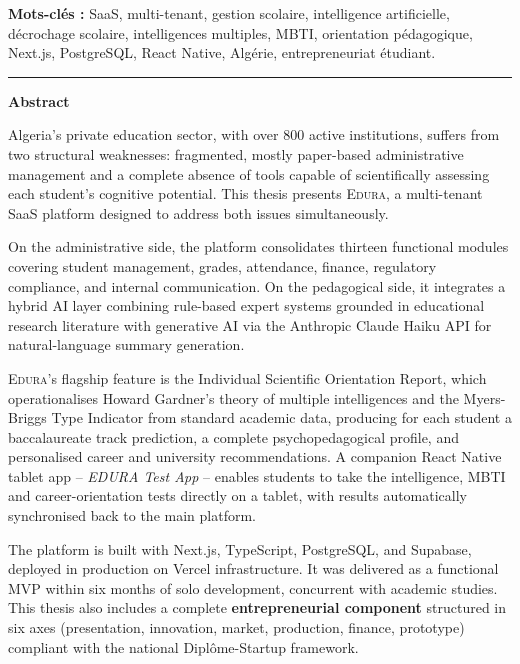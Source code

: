 \documentclass[12pt,a4paper,oneside]{report}
\newcommand{\edura}{\textsc{Edura}}
\begin{document}
\vspace{10pt}
\noindent\textbf{Mots-clés :} SaaS, multi-tenant, gestion scolaire, intelligence artificielle, décrochage scolaire, intelligences multiples, MBTI, orientation pédagogique, Next.js, PostgreSQL, React Native, Algérie, entrepreneuriat étudiant.

\vspace{20pt}
\noindent\rule{\linewidth}{0.4pt}

\vspace{10pt}
\noindent\textbf{Abstract}

\vspace{6pt}
Algeria's private education sector, with over 800 active institutions, suffers from two structural weaknesses: fragmented, mostly paper-based administrative management and a complete absence of tools capable of scientifically assessing each student's cognitive potential. This thesis presents \edura{}, a multi-tenant SaaS platform designed to address both issues simultaneously.

On the administrative side, the platform consolidates thirteen functional modules covering student management, grades, attendance, finance, regulatory compliance, and internal communication. On the pedagogical side, it integrates a hybrid AI layer combining rule-based expert systems grounded in educational research literature with generative AI via the Anthropic Claude Haiku API for natural-language summary generation.

\edura{}'s flagship feature is the Individual Scientific Orientation Report, which operationalises Howard Gardner's theory of multiple intelligences and the Myers-Briggs Type Indicator from standard academic data, producing for each student a baccalaureate track prediction, a complete psychopedagogical profile, and personalised career and university recommendations. A companion React Native tablet app -- \textit{EDURA Test App} -- enables students to take the intelligence, MBTI and career-orientation tests directly on a tablet, with results automatically synchronised back to the main platform.

The platform is built with Next.js, TypeScript, PostgreSQL, and Supabase, deployed in production on Vercel infrastructure. It was delivered as a functional MVP within six months of solo development, concurrent with academic studies. This thesis also includes a complete \textbf{entrepreneurial component} structured in six axes (presentation, innovation, market, production, finance, prototype) compliant with the national Diplôme-Startup framework.
\end{document}
